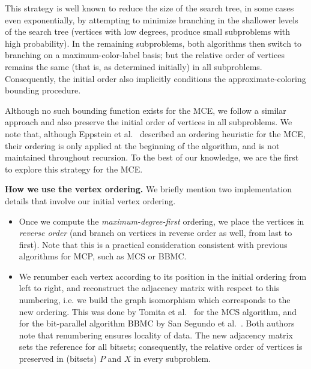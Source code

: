 \documentclass[final,1p]{elsarticle-modified}
\renewcommand{\paragraph}[1]{\medskip\noindent\textbf{#1.}}
\begin{document}
This strategy is well known to reduce the size of the search tree, in some cases even exponentially, by attempting to minimize branching in the shallower levels of the search tree (vertices with low degrees, produce small subproblems with high probability). In the remaining subproblems, both algorithms then switch to branching on a maximum-color-label basis; but the relative order of vertices remains the same (that is, as determined initially) in all subproblems. Consequently, the initial order also implicitly conditions the approximate-coloring bounding procedure.

Although no such bounding function exists for the MCE, we follow a similar approach and also preserve the initial order of vertices in all subproblems. We note that, although Eppstein et al.~\cite{els-2013} described an ordering heuristic for the MCE, their ordering is only applied at the beginning of the algorithm, and is not maintained throughout recursion. To the best of our knowledge, we are the first to explore this strategy for the MCE.


\paragraph{How we use the vertex ordering}
We briefly mention two implementation details that involve our initial vertex ordering.

\begin{itemize}
\item Once we compute the \emph{maximum-degree-first} ordering, we place the vertices in \emph{reverse order} (and branch on vertices in reverse order as well, from last to first). Note that this is a practical consideration consistent with previous algorithms for MCP, such as MCS or BBMC. 
\item We renumber each vertex according to its position in the initial ordering from left to right, and reconstruct the adjacency matrix with respect to this numbering, i.e. we build the graph isomorphism which corresponds to the new ordering. This was done by Tomita et al.~\cite{tomita-recoloring} for the MCS algorithm, and for the bit-parallel algorithm BBMC by San Segundo et al.~\cite{segundo-bitboard-2011,segundo-recoloring,segundo-implicit}. Both authors note that renumbering ensures locality of data. The new adjacency matrix sets the reference for all bitsets; consequently, the relative order of vertices is preserved in (bitsets) $P$ and $X$ in every subproblem.
\end{itemize}
\end{document}
